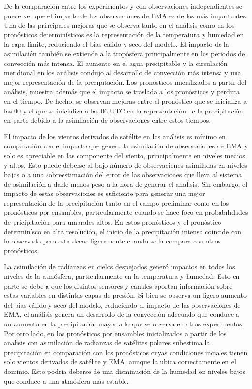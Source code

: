 \documentclass[12pt,oneside,a4paper]{reedthesis}
\begin{document}
De la comparación entre los experimentos y con observaciones independientes se puede ver que el impacto de las observaciones de EMA es de los más importantes. Una de las principales mejoras que se observa tanto en el análisis como en los pronósticos determinísticos es la representación de la temperatura y humedad en la capa límite, reduciendo el bias cálido y seco del modelo. El impacto de la asimilación también se extiende a la tropósfera principalmente en los periodos de convección más intensa. El aumento en el agua precipitable y la circulación meridional en los análisis condujo al desarrollo de convección más intensa y una mejor representación de la precipitación. Los pronósticos inicializados a partir del análisis, muestra además que el impacto se traslada a los pronósticos y perdura en el tiempo. De hecho, se observan mejoras entre el pronóstico que se inicializa a las 00 y el que se inicializa a las 06 UTC en la representación de la precipitación en parte debido a la asimilación de observaciones entre estos tiempos.

El impacto de los vientos derivados de satélite en los análisis es mínimo en comparación con el impacto que genera la asimilación de observaciones de EMA y solo es apreciable en las componente del viento, principalmente en niveles medios y altos. Esto puede deberse al bajo número de observaciones asimiladas en niveles bajos o a una sobreestimación del error de las observaciones que lleva al sistema de asimilación a darle menos peso a la hora de generar el anaĺisis. Sin embargo, el impacto de estas observaciones es suficiente para generar una mejor representación de la precipitación tanto en el campo preliminar como en los pronósticos por ensambles, particularmente cuando se hace foco en probabilidades de pricipitación para umbrales altos. En estos pronósticos y el pronóstico determinísco en alta resolución, el inicio de la precipitación intensa coincide con lo observado pero esta decae ligeramente cuando se la compara con otros pronósticos.

La asimilación de radianzas en cielos despejados generó impactos en todos los niveles de la atmósfera, particularmente en la temperatura y humedad. Esto en parte se debe a que los disintos sensores y canales aportan información sobre estas variables en distintas capas de presión. Si bien se observa un ligero aumento del bias cálido y seco del modelo, reduciendo el impacto de las observaciones de EMA, el análisis genera un desarrollo de la convección adecuado que conduce a un aumento en la precipitación mayor a lo que se observa en otros experimentos. Por otro lado, en los pronósticos por ensambles inicializados a partir de los analisis con asimilación de radianzas de satélites polares subestima la precipitación en comparación con los pronósticos cuyas condiciones inciales tienen solo vientos derivados de satélite y EMA, aunque la ubica correctamente en el dominio. Esto podría deberse de una disminución de la humedad en niveles bajos que conduce a una atmósfera más estable.
\end{document}
